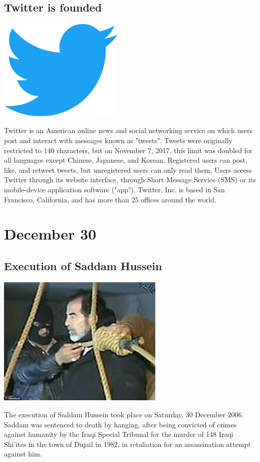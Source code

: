 \documentclass[11pt]{report}
\begin{document}
\subsection{Twitter is founded}
\vspace{2mm}\begin{center}\includegraphics[width=6cm]{./img/twitter.png}\end{center}
Twitter is an American online news and social networking service on which users post and interact with messages known as "tweets". Tweets were originally restricted to 140 characters, but on November 7, 2017, this limit was doubled for all languages except Chinese, Japanese, and Korean. Registered users can post, like, and retweet tweets, but unregistered users can only read them. Users access Twitter through its website interface, through Short Message Service (SMS) or its mobile-device application software ("app"). Twitter, Inc. is based in San Francisco, California, and has more than 25 offices around the world.

\section{December 30}
\subsection{Execution of Saddam Hussein}
\vspace{2mm}\begin{center}\includegraphics[width=8cm]{./img/saddamhusseinexec.jpg}\end{center}
The execution of Saddam Hussein took place on Saturday, 30 December 2006. Saddam was sentenced to death by hanging, after being convicted of crimes against humanity by the Iraqi Special Tribunal for the murder of 148 Iraqi Shi'ites in the town of Dujail in 1982, in retaliation for an assassination attempt against him.
\end{document}
